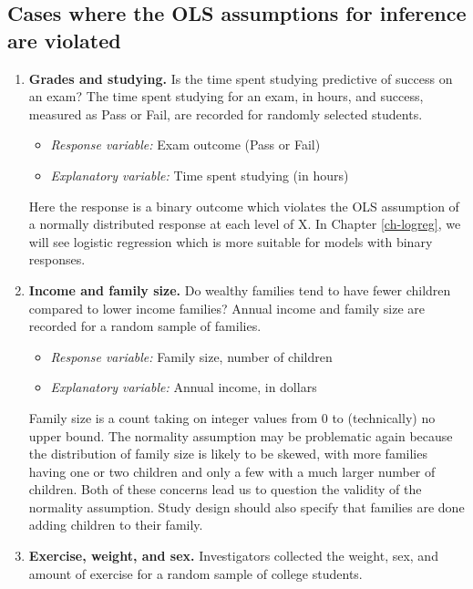 \documentclass[
]{krantz}
\providecommand{\tightlist}{%
  \setlength{\itemsep}{0pt}\setlength{\parskip}{0pt}}
\begin{document}
\hypertarget{cases-where-the-ols-assumptions-for-inference-are-violated}{%
\subsection{Cases where the OLS assumptions for inference are violated}\label{cases-where-the-ols-assumptions-for-inference-are-violated}}

\begin{enumerate}
\def\labelenumi{\arabic{enumi})}
\item
  \textbf{Grades and studying.} Is the time spent studying predictive of success on an exam? The time spent studying for an exam, in hours, and success, measured as Pass or Fail, are recorded for randomly selected students.

  \begin{itemize}
  \tightlist
  \item
    \emph{Response variable:} Exam outcome (Pass or Fail)
  \item
    \emph{Explanatory variable:} Time spent studying (in hours)\\
  \end{itemize}

  Here the response is a binary outcome which violates the OLS assumption of a normally distributed response at each level of X. In Chapter \ref{ch-logreg}, we will see logistic regression which is more suitable for models with binary responses.
\item
  \textbf{Income and family size.} Do wealthy families tend to have fewer children compared to lower income families? Annual income and family size are recorded for a random sample of families.

  \begin{itemize}
  \tightlist
  \item
    \emph{Response variable:} Family size, number of children
  \item
    \emph{Explanatory variable:} Annual income, in dollars\\
  \end{itemize}

  Family size is a count taking on integer values from 0 to (technically) no upper bound. The normality assumption may be problematic again because the distribution of family size is likely to be skewed, with more families having one or two children and only a few with a much larger number of children. Both of these concerns lead us to question the validity of the normality assumption. Study design should also specify that families are done adding children to their family.
\item
  \textbf{Exercise, weight, and sex.} Investigators collected the weight, sex, and amount of exercise for a random sample of college students.


\end{enumerate}
\end{document}
